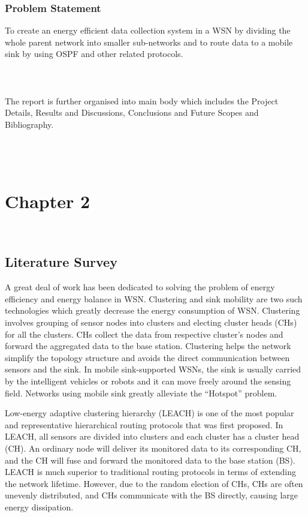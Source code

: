 \documentclass{article}
\begin{document}
\subsection{Problem Statement}
 To create an energy efficient data collection system in a WSN by dividing the  whole parent network into smaller sub-networks and to route data to a mobile sink by using  OSPF and other related protocols.\\
\\
\\
\\
The report is further organised into main body which includes the Project Details, Results and Discussions, Conclusions and Future Scopes and Bibliography.\\
\\
\\
\\
\chapter{\textbf{Chapter 2}}\\
\section{Literature Survey}
A great deal of work has been dedicated to solving the problem of energy efficiency and energy balance in WSN. Clustering and sink mobility are two such technologies which  greatly decrease the energy consumption of WSN.  Clustering involves grouping of sensor nodes into clusters and electing cluster heads (CHs) for all the clusters. CHs collect the data from respective cluster’s nodes and forward the aggregated data to the base station. Clustering helps the network simplify the topology structure and avoids the direct communication between sensors and the sink. In mobile sink-supported WSNs, the sink is usually carried by the intelligent vehicles or robots and it can move freely around the sensing field. Networks using mobile sink greatly alleviate the “Hotspot” problem.

Low-energy adaptive clustering hierarchy (LEACH) is one of the most popular and representative hierarchical routing protocols that was first proposed. In LEACH, all sensors are divided into clusters and each cluster has a cluster head (CH). An ordinary node will deliver its monitored data to its corresponding CH, and the CH will fuse and forward the monitored data to the base station (BS). LEACH is much superior to traditional routing protocols in terms of extending the network lifetime. However, due to the random election of CHs, CHs are often unevenly distributed, and CHs communicate with the BS directly, causing large energy dissipation.
\end{document}
